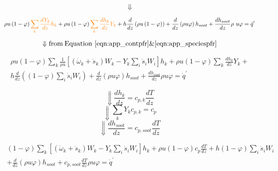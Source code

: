\begin{equation*}
	\Downarrow
\end{equation*}

\begin{equation*}
	\rho u\left(1-\varphi\right)
	\color{orange}\sum_{k}{\frac{dY_k}{dz}h_k}
	\color{black}
	+
	\rho u\left(1-\varphi\right)
	\color{orange}\sum_{k}{\frac{dh_k}{dz}Y_k}
	\color{black}
	+
	h\frac{d}{dz}\left(\rho u\left(1-\varphi\right)\right)
	+
	\color{black}
	\frac{d}{dz}\left(\rho u\varphi\right)h_{soot}+\frac{dh_{soot}}{dz}\rho\ u\varphi={\dot{q}}^\prime
\end{equation*}


\begin{equation*}
	\Downarrow \mathrm{from \: Equation~\eqref{eqn:app_contpfr} \& \eqref{eqn:app_speciespfr}}
\end{equation*}


\begin{equation*}
	\begin{split}
	\rho 
	u\left(1-\varphi\right)
	\sum_{k}
	{\frac{1}{\rho u}
	\left[
		({\dot{\omega}}_k+{\dot{s}}_k)W_k-Y_k\sum_{i}{{\dot{s}}_iW_i}
	\right]h_k}
	+
	\rho u\left(1-\varphi\right)\sum_{k}{\frac{dh_k}{dz}Y_k}
	+ \\
	h\frac{d}{dz}
	\left(
		(1-\varphi)\sum_{i}{{\dot{s}}_iW_i}
	\right)
	+\frac{d}{dz}\left(\rho u\varphi\right)h_{soot}
	+
	\frac{dh_{soot}}{dz}\rho u\varphi={\dot{q}}^\prime
	\end{split}	
\end{equation*}

\begin{equation*}
	\Downarrow \frac{dh_k}{dz} = c_{p,k} \frac{dT}{dz}
\end{equation*}
\begin{equation*}
	\Downarrow \sum_{k} Y_k c_{p,k} = c_p
\end{equation*}
\begin{equation*}
	\Downarrow \frac{dh_{soot}}{dz} = c_{p,soot} \frac{dT}{dz}
\end{equation*}

\begin{equation*}
	\begin{split}
	\left(1-\varphi\right)\sum_{k}{\left[({\dot{\omega}}_k+{\dot{s}}_k)W_k-Y_k\sum_{i}{{\dot{s}}_iW_i}\right]h_k}+\rho u
	\left(1-\varphi\right)
	c_{p}\frac{dT}{dz}
	+ h(1-\varphi)\sum_{i}{{\dot{s}}_iW_i}
	\\
	+
	\frac{d}{dz}\left(\rho u\varphi\right)h_{soot}+c_{p,soot}\frac{dT}{dz}\rho u\varphi={\dot{q}}^\prime
	\end{split}
\end{equation*}

